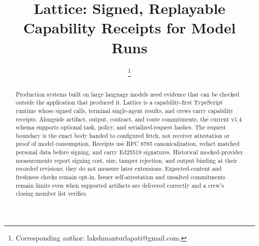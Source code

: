 \documentclass[conference]{IEEEtran}
\begin{document}
\title{Lattice: Signed, Replayable Capability Receipts for Model Runs}

\author{
\and
{}
\thanks{Corresponding author: lakshmanturlapati@gmail.com.}}

\maketitle

\begin{abstract}
Production systems built on large language models need evidence that can be checked
outside the application that produced it. Lattice is a capability-first TypeScript
runtime whose signed calls, terminal single-agent results, and crews carry capability
receipts. Alongside artifact, output, contract, and route commitments, the current v1.4
schema supports optional task, policy, and serialized-request hashes. The request
boundary is the exact body handed to configured fetch, not receiver attestation or
proof of model consumption. Receipts use RFC 8785 canonicalization, redact matched
personal data before signing, and carry Ed25519 signatures. Historical mocked-provider
measurements report signing cost, size, tamper rejection, and output binding at their
recorded revisions; they do not measure later extensions. Expected-content and
freshness checks remain opt-in. Issuer self-attestation and unsalted commitments remain
limits even when supported artifacts are delivered correctly and a crew's closing
member list verifies.
\end{abstract}
\end{document}

